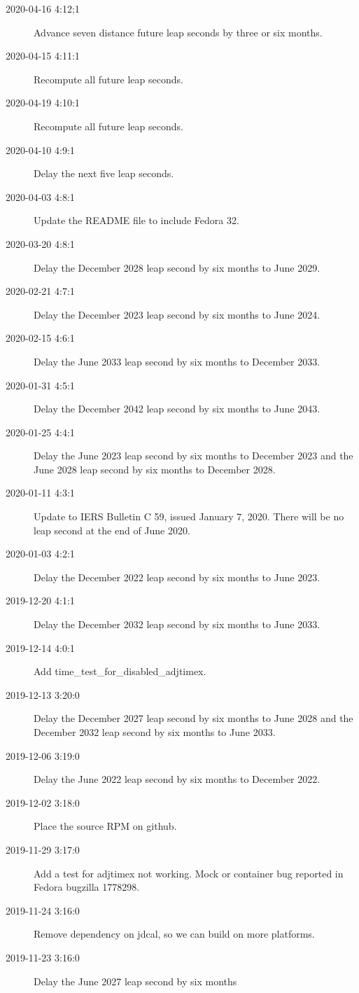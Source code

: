 \documentclass[letterpaper,twoside]{article}
\begin{document}
\begin{description}
\item[2020-04-16 4:12;1]Advance seven distance future leap seconds
  by three or six months.
\item[2020-04-15 4:11:1]Recompute all future leap seconds.
\item[2020-04-19 4:10:1]Recompute all future leap seconds.
\item[2020-04-10 4:9:1]Delay the next five leap seconds.
\item[2020-04-03 4:8:1]Update the README file to include Fedora 32.
\item[2020-03-20 4:8:1]Delay the December 2028 leap second by six months
  to June 2029.
\item[2020-02-21 4:7:1]Delay the December 2023 leap second by six months
  to June 2024.
\item[2020-02-15 4:6:1]Delay the June 2033 leap second by six months
  to December 2033.
\item[2020-01-31 4:5:1]Delay the December 2042 leap second by six months
  to June 2043.
\item[2020-01-25 4:4:1]Delay the June 2023 leap second by six months
  to December 2023 and the June 2028 leap second by six months to December 2028.
\item[2020-01-11 4:3:1]Update to IERS Bulletin C 59, issued January 7, 2020.
  There will be no leap second at the end of June 2020.
\item[2020-01-03 4:2:1]Delay the December 2022 leap second by six months
  to June 2023.
\item[2019-12-20 4:1:1]Delay the December 2032 leap second by six months
  to June 2033.
\item[2019-12-14 4:0:1]Add {\ttfamily time\_test\_for\_disabled\_adjtimex}.
\item[2019-12-13 3:20:0]Delay the December 2027 leap second by six months
  to June 2028 and the December 2032 leap second by six months to June 2033.
\item[2019-12-06 3:19:0]Delay the June 2022 leap second by six months
  to December 2022.
\item[2019-12-02 3:18:0]Place the source RPM on github.
\item[2019-11-29 3:17:0]Add a test for adjtimex not working.
  Mock or container bug reported in Fedora bugzilla 1778298.
\item[2019-11-24 3:16:0]Remove dependency on jdcal, so we can build
  on more platforms.
\item[2019-11-23 3:16:0]Delay the June 2027 leap second by six months

\end{description}
\end{document}
